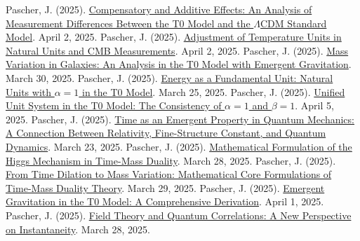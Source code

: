 \documentclass[12pt,a4paper]{article}
\begin{document}
	\begin{thebibliography}{99}
		 Pascher, J. (2025). \href{https://github.com/jpascher/T0-Time-Mass-Duality/tree/main/2/pdf/English/MessdifferenzenT0StandardEn.pdf}{Compensatory and Additive Effects: An Analysis of Measurement Differences Between the T0 Model and the \(\Lambda\)CDM Standard Model}. April 2, 2025.
		 Pascher, J. (2025). \href{https://github.com/jpascher/T0-Time-Mass-Duality/tree/main/2/pdf/English/TempEinheitenCMBEn.pdf}{Adjustment of Temperature Units in Natural Units and CMB Measurements}. April 2, 2025.
		 Pascher, J. (2025). \href{https://github.com/jpascher/T0-Time-Mass-Duality/tree/main/2/pdf/English/MassVarGalaxienEn.pdf}{Mass Variation in Galaxies: An Analysis in the T0 Model with Emergent Gravitation}. March 30, 2025.
		 Pascher, J. (2025). \href{https://github.com/jpascher/T0-Time-Mass-Duality/tree/main/2/pdf/English/NatEinheitenAlpha1En.pdf}{Energy as a Fundamental Unit: Natural Units with \(\alpha = 1\) in the T0 Model}. March 25, 2025.
		 Pascher, J. (2025). \href{https://github.com/jpascher/T0-Time-Mass-Duality/tree/main/2/pdf/English/Alpha1Beta1KonsistenzEn.pdf}{Unified Unit System in the T0 Model: The Consistency of \(\alpha = 1\) and \(\beta = 1\)}. April 5, 2025.
		 Pascher, J. (2025). \href{https://github.com/jpascher/T0-Time-Mass-Duality/tree/main/2/pdf/English/ZeitEmergentQMEn.pdf}{Time as an Emergent Property in Quantum Mechanics: A Connection Between Relativity, Fine-Structure Constant, and Quantum Dynamics}. March 23, 2025.
		 Pascher, J. (2025). \href{https://github.com/jpascher/T0-Time-Mass-Duality/tree/main/2/pdf/English/MathHiggsZeitMasseEn.pdf}{Mathematical Formulation of the Higgs Mechanism in Time-Mass Duality}. March 28, 2025.
		 Pascher, J. (2025). \href{https://github.com/jpascher/T0-Time-Mass-Duality/tree/main/2/pdf/English/MathZeitMasseLagrangeEn.pdf}{From Time Dilation to Mass Variation: Mathematical Core Formulations of Time-Mass Duality Theory}. March 29, 2025.
		 Pascher, J. (2025). \href{https://github.com/jpascher/T0-Time-Mass-Duality/tree/main/2/pdf/English/EmergentGravT0En.pdf}{Emergent Gravitation in the T0 Model: A Comprehensive Derivation}. April 1, 2025.
		 Pascher, J. (2025). \href{https://github.com/jpascher/T0-Time-Mass-Duality/tree/main/2/pdf/English/FeldtheorieQuantenEn.pdf}{Field Theory and Quantum Correlations: A New Perspective on Instantaneity}. March 28, 2025.

\end{thebibliography}
\end{document}
